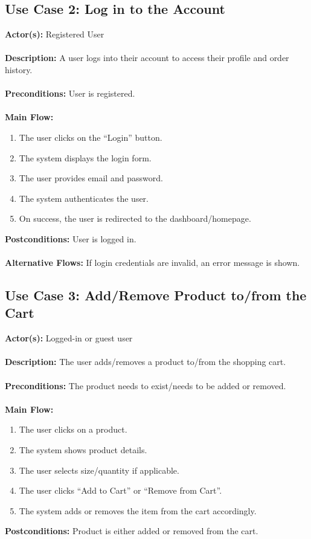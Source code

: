 \documentclass[a4paper,12pt]{article}
\begin{document}
    \subsection*{Use Case 2: Log in to the Account}
	\textbf{Actor(s):} Registered User \\ \\
	\textbf{Description:} A user logs into their account to access their profile and order history. \\ \\
	\textbf{Preconditions:} User is registered. \\ \\
	\textbf{Main Flow:}
	\begin{enumerate}
  		\item The user clicks on the ``Login'' button.
  		\item The system displays the login form.
  		\item The user provides email and password.
  		\item The system authenticates the user.
  		\item On success, the user is redirected to the dashboard/homepage.
	\end{enumerate}
	\textbf{Postconditions:} User is logged in. \\ \\
	\textbf{Alternative Flows:} If login credentials are invalid, an error message is shown.
	\subsection*{Use Case 3: Add/Remove Product to/from the Cart}
	\textbf{Actor(s):} Logged-in or guest user \\ \\
	\textbf{Description:} The user adds/removes a product to/from the shopping cart. \\ \\
	\textbf{Preconditions:} The product needs to exist/needs to be added or removed. \\ \\
	\textbf{Main Flow:}
	\begin{enumerate}
  		\item The user clicks on a product.
  		\item The system shows product details.
  		\item The user selects size/quantity if applicable.
  		\item The user clicks ``Add to Cart'' or ``Remove from Cart''.
  		\item The system adds or removes the item from the cart accordingly.
	\end{enumerate}
	\textbf{Postconditions:} Product is either added or removed from the cart.
\end{document}
